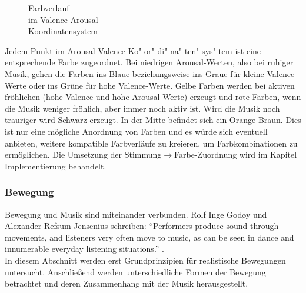 \documentclass[11pt,a4paper]{article}
\begin{document}
\begin{wrapfigure}{l}{0.5\linewidth}
\captionsetup{justification=centering}
\caption[Farbverlauf im Valence-Arousal-Koordinatensystem]{Farbverlauf\\im Valence-Arousal-\\Koordinatensystem}
\label{fig:Farbverlauf}
\end{wrapfigure}
\noindent
Jedem Punkt im Arousal-Valence-Ko"-or"-di"-na"-ten"-sys"-tem ist eine entsprechende Farbe zugeordnet. Bei niedrigen Arousal-Werten, also bei ruhiger Musik, gehen die Farben ins Blaue beziehungsweise ins Graue für kleine Valence-Werte oder ins Grüne für hohe Valence-Werte. Gelbe Farben werden bei aktiven fröhlichen (hohe Valence und hohe Arousal-Werte) erzeugt und rote Farben, wenn die Musik weniger fröhlich, aber immer noch aktiv ist. Wird die Musik noch trauriger wird Schwarz erzeugt. In der Mitte befindet sich ein Orange-Braun. Dies ist nur eine mögliche Anordnung von Farben und es würde sich eventuell anbieten, weitere kompatible Farbverläufe zu kreieren, um Farbkombinationen zu ermöglichen. Die Umsetzung der Stimmung$ \rightarrow $Farbe-Zuordnung wird im Kapitel Implementierung behandelt.

\subsubsection*{Bewegung}
Bewegung und Musik sind miteinander verbunden. Rolf Inge God{\o}y und Alexander Refsum Jensenius schreiben: ``Performers produce sound through movements, and listeners very often move to music, as can be seen in dance and innumerable everyday listening situations.'' \cite[S. 1]{905eee055abaf2a4f198ce11f35362a8963f61d552297a02dfc8fbc0c4f78679}.\\
In diesem Abschnitt werden erst Grundprinzipien für realistische Bewegungen untersucht. Anschließend werden unterschiedliche Formen der Bewegung betrachtet und deren Zusammenhang mit der Musik herausgestellt.
\end{document}
